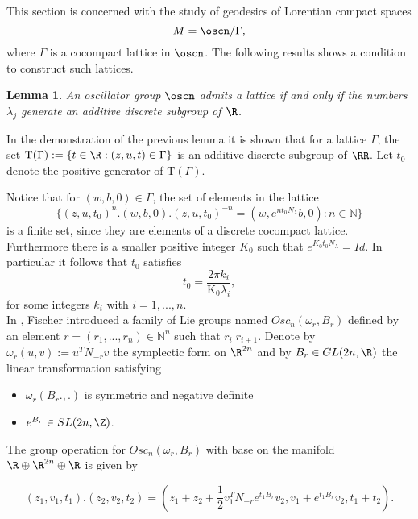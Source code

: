 \documentclass[12pt]{amsart}
\theoremstyle{plain}
\newtheorem{lem}[thm]{Lemma}
\theoremstyle{definition}
\theoremstyle{remark}
\begin{document}
	This section is concerned with the study of geodesics of Lorentian compact spaces  $$M=\oscn/ \Gamma,$$ where $\Gamma$ is a cocompact lattice in $\oscn$. The following results shows a condition to construct such lattices. 
	
	\begin{lem}\cite{MeRe}\label{lema_medina}
		An oscillator group $\oscn$ admits a lattice if and only if the numbers $\lambda_j$ generate an additive discrete subgroup of $\R$.
	\end{lem}
	
	In the demonstration of the previous lemma it is  shown that for a lattice $\Gamma$, the set $\mathrm{T}(\Gamma):=\{ t \in \R : (z,u,t) \in \Gamma \}$ is an additive discrete subgroup of $\RR$. %
	 Let $t_0$ denote the positive generator of $\mathrm{T}(\Gamma)$. 
	
	Notice that for $(w,b,0) \in \Gamma$, the set of elements in the lattice
	\begin{equation*}
		\{ (z,u,t_0)^n.(w,b,0).(z,u,t_0)^{-n}=(w,e^{n t_0 N_{\lambda}}b,0) : n \in \mathbb{N} \}
	\end{equation*}
	 is a finite set, since they are elements of a discrete cocompact lattice. Furthermore there is a smaller positive integer $K_0$ such that $e^{K_0 t_0 N_{\lambda}} = Id$. In particular it follows that $t_0$ satisfies
	\begin{equation} \label{oscilator-N}
		t_0=\frac{2 \pi k_i}{\mathrm{K_0} \lambda_i},
	\end{equation}
	for some integers $k_i$ with $i=1, ..., n$.\\
	
	In \cite{MF}, Fischer introduced a family of Lie groups named $Osc_n(\omega_r, B_r)$ defined by an element $r=(r_1, ..., r_n) \in \mathbb{N}^n$ such that $r_i | r_{i+1}$. Denote by $\omega_r(u,v):=u^TN_{-r}v$ the symplectic form on $\R^{2n}$ and by $B_r \in GL(2n, \R)$ the linear transformation satisfying
	
	\begin{itemize}
		\item $\omega_r(B_r.,.)$ is symmetric and negative definite
		\item $e^{B_r} \in SL(2n,\Z)$.
	\end{itemize}
	
	The group operation for $Osc_n(\omega_r, B_r)$ with base on the manifold $\R \oplus \R^{2n} \oplus \R$ is given by
	
	\begin{equation}
		(z_1,v_1,t_1) . (z_2,v_2,t_2)=(z_1+z_2+\frac{1}{2}v_1^{T}N_{-r} e^{t_1 B_r}v_2,v_1+e^{t_1 B_r}v_2,t_1+t_2).
	\end{equation}
	
\end{document}

